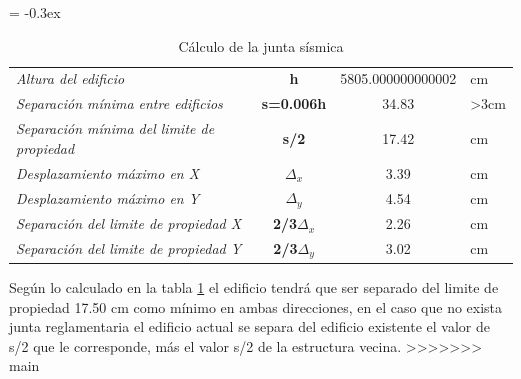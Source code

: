 \documentclass{article}%
\begin{document}
%


\begin{table}[H]%
\centering%
\caption{Cálculo de la junta sísmica}%
\extrarowheight = -0.3ex%
\renewcommand{\arraystretch}{1.5}%
\begin{tabular}{l|c|c|l}%
\cline{2-3}%
\textit{Altura del edificio} & \textbf{h} & {5805.000000000002} & {cm} \\%
\cline{2-3}%
\textit{Separación mínima entre edificios} & \textbf{s=0.006h} & {34.83} & {>3cm} \\%
\cline{2-3}%
\textit{Separación mínima del limite de propiedad} & \textbf{s/2} & {17.42} & {cm} \\%
\cline{2-3}%
\textit{Desplazamiento máximo en X} & \textbf{$\Delta_x$} & {3.39} & {cm} \\%
\cline{2-3}%
\textit{Desplazamiento máximo en Y} & \textbf{$\Delta_y$} & {4.54} & {cm} \\%
\cline{2-3}%
\textit{Separación del limite de propiedad X} & \textbf{2/3$\Delta_{x}$} & {2.26} & {cm} \\%
\cline{2-3}%
\textit{Separación del limite de propiedad Y} & \textbf{2/3$\Delta_{y}$} & {3.02} & {cm} \\%
\cline{2-3}%
\end{tabular}%
\label{tab:junta_sis}%
\end{table}

%
Según lo calculado en la tabla \ref{tab:junta_sis} %
 el edificio tendrá que ser separado del limite de propiedad 17.50 cm como mínimo en ambas direcciones, en el caso que no exista junta reglamentaria el edificio actual se separa del edificio existente el valor de s/2 que le corresponde, más el valor s/2 de la estructura vecina.
>>>>>>> main

%
\end{document}
